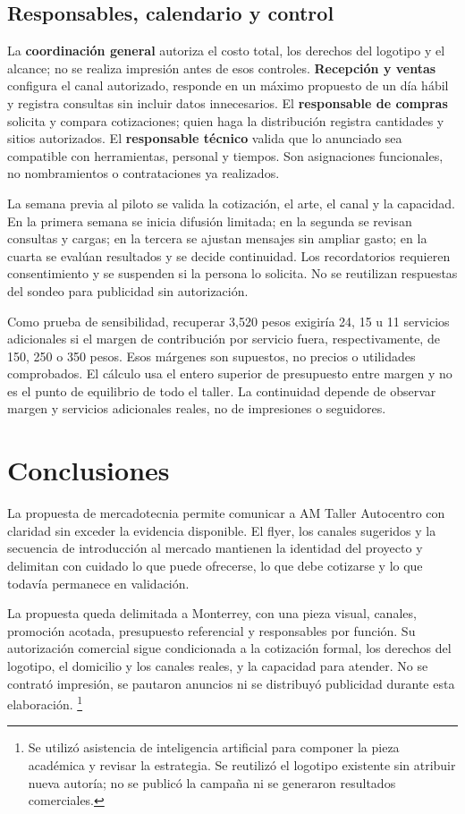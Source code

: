 {\subsection{Responsables, calendario y control}

La \textbf{coordinación general} autoriza el costo total, los derechos del logotipo y el alcance; no se realiza impresión antes de esos controles. \textbf{Recepción y ventas} configura el canal autorizado, responde en un máximo propuesto de un día hábil y registra consultas sin incluir datos innecesarios. El \textbf{responsable de compras} solicita y compara cotizaciones; quien haga la distribución registra cantidades y sitios autorizados. El \textbf{responsable técnico} valida que lo anunciado sea compatible con herramientas, personal y tiempos. Son asignaciones funcionales, no nombramientos o contrataciones ya realizados.

La semana previa al piloto se valida la cotización, el arte, el canal y la capacidad. En la primera semana se inicia difusión limitada; en la segunda se revisan consultas y cargas; en la tercera se ajustan mensajes sin ampliar gasto; en la cuarta se evalúan resultados y se decide continuidad. Los recordatorios requieren consentimiento y se suspenden si la persona lo solicita. No se reutilizan respuestas del sondeo para publicidad sin autorización.

Como prueba de sensibilidad, recuperar 3,520 pesos exigiría 24, 15 u 11 servicios adicionales si el margen de contribución por servicio fuera, respectivamente, de 150, 250 o 350 pesos. Esos márgenes son supuestos, no precios o utilidades comprobados. El cálculo usa el entero superior de presupuesto entre margen y no es el punto de equilibrio de todo el taller. La continuidad depende de observar margen y servicios adicionales reales, no de impresiones o seguidores.

\section{Conclusiones}

La propuesta de mercadotecnia permite comunicar a AM Taller Autocentro con claridad sin exceder la evidencia disponible. El flyer, los canales sugeridos y la secuencia de introducción al mercado mantienen la identidad del proyecto y delimitan con cuidado lo que puede ofrecerse, lo que debe cotizarse y lo que todavía permanece en validación.

La propuesta queda delimitada a Monterrey, con una pieza visual, canales, promoción acotada, presupuesto referencial y responsables por función. Su autorización comercial sigue condicionada a la cotización formal, los derechos del logotipo, el domicilio y los canales reales, y la capacidad para atender. No se contrató impresión, se pautaron anuncios ni se distribuyó publicidad durante esta elaboración.
\footnote{Se utilizó asistencia de inteligencia artificial para componer la pieza académica y revisar la estrategia. Se reutilizó el logotipo existente sin atribuir nueva autoría; no se publicó la campaña ni se generaron resultados comerciales.}
}

